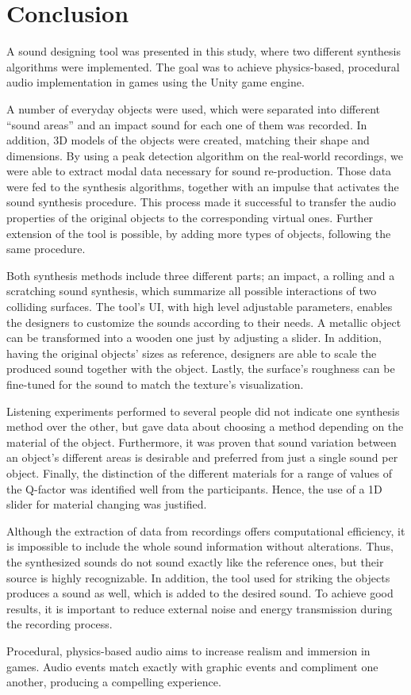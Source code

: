 \chapter{Conclusion}

A sound designing tool was presented in this study, where two different synthesis algorithms were implemented. The goal was to achieve physics-based, procedural audio implementation in games using the Unity\textsuperscript{\textregistered} game engine. 

A number of everyday objects were used, which were separated into different ``sound areas'' and an impact sound for each one of them was recorded. In addition, 3D models of the objects were created, matching their shape and dimensions. By using a peak detection algorithm on the real-world recordings, we were able to extract modal data necessary for sound re-production. Those data were fed to the synthesis algorithms, together with an impulse that activates the sound synthesis procedure. This process made it successful to transfer the audio properties of the original objects to the corresponding virtual ones. Further extension of the tool is possible, by adding more types of objects, following the same procedure.

Both synthesis methods include three different parts; an impact, a rolling and a scratching sound synthesis, which summarize all possible interactions of two colliding surfaces. The tool's \gls{UI}, with high level adjustable parameters, enables the designers to customize the sounds according to their needs. A metallic object can be transformed into a wooden one just by adjusting a slider. In addition, having the original objects' sizes as reference, designers are able to scale the produced sound together with the object. Lastly, the surface's roughness can be fine-tuned for the sound to match the texture's visualization.

Listening experiments performed to several people did not indicate one synthesis method over the other, but gave data about choosing a method depending on the material of the object. Furthermore, it was proven that sound variation between an object's different areas is desirable and preferred from just a single sound per object. Finally, the distinction of the different materials for a range of values of the Q-factor was identified well from the participants. Hence, the use of a 1D slider for material changing was justified.

Although the extraction of data from recordings offers computational efficiency, it is impossible to include the whole sound information without alterations. Thus, the synthesized sounds do not sound exactly like the reference ones, but their source is highly recognizable. In addition, the tool used for striking the objects produces a sound as well, which is added to the desired sound. To achieve good results, it is important to reduce external noise and energy transmission during the recording process.

Procedural, physics-based audio aims to increase realism and immersion in games. Audio events match exactly with graphic events and compliment one another, producing a compelling experience.